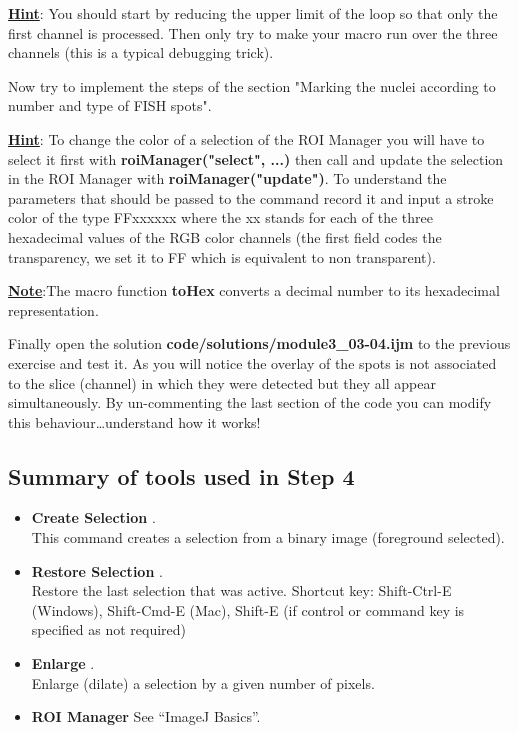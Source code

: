 \underline{\textbf{Hint}}: You should start by reducing the upper limit of the loop so that only the first channel is processed. Then only try to make your macro run over the three channels (this is a typical debugging trick).

Now try to implement the steps of the section "Marking the nuclei according to number and type of FISH spots".

\underline{\textbf{Hint}}: To change the color of a selection of the ROI Manager you will have to select it first with \textbf{roiManager("select", ...)} then call  and update the selection in the ROI Manager with \textbf{roiManager("update")}. To understand the parameters that should be passed to the command record it and input a stroke color of the type FFxxxxxx where the xx stands for each of the three hexadecimal values of the RGB color channels (the first field codes the transparency, we set it to FF which is equivalent to non transparent).

\underline{\textbf{Note}}:The macro function \textbf{toHex} converts a decimal number to its hexadecimal representation.

Finally open the solution \textbf{code/solutions/module3\_03-04.ijm} to the previous exercise and test it. As you will notice the overlay of the spots is not associated to the slice (channel) in which they were detected but they all appear simultaneously. By un-commenting the last section of the code you can modify this behaviour\ldots understand how it works!

\subsection{Summary of tools used in Step 4}

\begin{itemize}
\item \textbf{Create Selection} .\\
This command creates a selection from a binary image (foreground selected).

\item \textbf{Restore Selection} .\\
Restore the last selection that was active. Shortcut key: Shift-Ctrl-E (Windows), Shift-Cmd-E (Mac), Shift-E (if control or command key is specified as not required)

\item \textbf{Enlarge} .\\
Enlarge (dilate) a selection by a given number of pixels.

\item \textbf{ROI Manager} See ``ImageJ Basics''.

\end{itemize}

\newpage